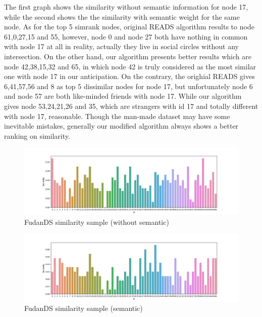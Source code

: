 \documentclass[a4paper, 12pt]{article} %
\begin{document}
    The first graph shows the similarity without semantic information for node 17, while the second shows the the similarity with semantic weight for the same node. As for the top 5 simrank nodes, original READS algorithm results to node 61,0,27,15 and 55, however, node 0 and node 27 both have nothing in common with node 17 at all in reality, actually they live in social circles without any intersection. On the other hand, our algorithm presents better results which are node 42,38,15,32 and 65, in which node 42 is truly considered as the most similar one with node 17 in our anticipation. On the contrary, the orighial READS gives 6,41,57,56 and 8 as top 5 dissimilar nodes for node 17, but unfortunately node 6 and node 57 are both like-minded friends with node 17. While our algorithm gives node 53,24,21,26 and 35, which are strangers with id 17 and totally different with node 17, reasonable. Though the man-made dataset may have some inevitable mistakes, generally our modified algorithm always shows a better ranking on similarity. 
    
    \begin{figure}[H]
        \centering
        \includegraphics[width=\textwidth]{img/fudands-sample-1.png}
        \caption{FudanDS similarity sample (without semantic)}
    \end{figure}
    
    \begin{figure}[H]
        \centering
        \includegraphics[width=\textwidth]{img/fudands-sample-2.png}
        \caption{FudanDS similarity sample (semantic)}
    \end{figure}


\bigskip
\end{document}

